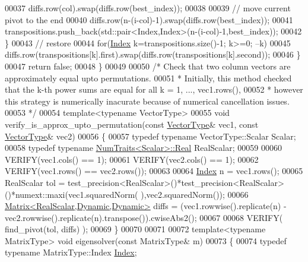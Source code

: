 \begin{DoxyCode}
00037       diffs.row(col).swap(diffs.row(best\_index));
00038       
00039       \textcolor{comment}{// move current pivot to the end}
00040       diffs.row(n-(i-col)-1).swap(diffs.row(best\_index));
00041       transpositions.push\_back(std::pair<Index,Index>(n-(i-col)-1,best\_index));
00042     \}
00043     \textcolor{comment}{// restore}
00044     \textcolor{keywordflow}{for}(\hyperlink{namespace_eigen_a62e77e0933482dafde8fe197d9a2cfde}{Index} k=transpositions.size()-1; k>=0; --k)
00045       diffs.row(transpositions[k].first).swap(diffs.row(transpositions[k].second));
00046   \}
00047   \textcolor{keywordflow}{return} \textcolor{keyword}{false};
00048 \}
00049 
00050 \textcolor{comment}{/* Check that two column vectors are approximately equal upto permutations.}
00051 \textcolor{comment}{ * Initially, this method checked that the k-th power sums are equal for all k = 1, ..., vec1.rows(),}
00052 \textcolor{comment}{ * however this strategy is numerically inacurate because of numerical cancellation issues.}
00053 \textcolor{comment}{ */}
00054 \textcolor{keyword}{template}<\textcolor{keyword}{typename} VectorType>
00055 \textcolor{keywordtype}{void} verify\_is\_approx\_upto\_permutation(\textcolor{keyword}{const} \hyperlink{struct_vector_type}{VectorType}& vec1, \textcolor{keyword}{const} 
      \hyperlink{struct_vector_type}{VectorType}& vec2)
00056 \{
00057   \textcolor{keyword}{typedef} \textcolor{keyword}{typename} VectorType::Scalar Scalar;
00058   \textcolor{keyword}{typedef} \textcolor{keyword}{typename} \hyperlink{group___core___module_struct_eigen_1_1_num_traits}{NumTraits<Scalar>::Real} RealScalar;
00059 
00060   VERIFY(vec1.cols() == 1);
00061   VERIFY(vec2.cols() == 1);
00062   VERIFY(vec1.rows() == vec2.rows());
00063   
00064   \hyperlink{namespace_eigen_a62e77e0933482dafde8fe197d9a2cfde}{Index} n = vec1.rows();
00065   RealScalar tol = test\_precision<RealScalar>()*test\_precision<RealScalar>()*numext::maxi(vec1.squaredNorm(
      ),vec2.squaredNorm());
00066   \hyperlink{group___core___module_class_eigen_1_1_matrix}{Matrix<RealScalar,Dynamic,Dynamic>} diffs = (vec1.rowwise().replicate(n)
       - vec2.rowwise().replicate(n).transpose()).cwiseAbs2();
00067   
00068   VERIFY( find\_pivot(tol, diffs) );
00069 \}
00070 
00071 
00072 \textcolor{keyword}{template}<\textcolor{keyword}{typename} MatrixType> \textcolor{keywordtype}{void} eigensolver(\textcolor{keyword}{const} MatrixType& m)
00073 \{
00074   \textcolor{keyword}{typedef} \textcolor{keyword}{typename} MatrixType::Index \hyperlink{namespace_eigen_a62e77e0933482dafde8fe197d9a2cfde}{Index};

\end{DoxyCode}
